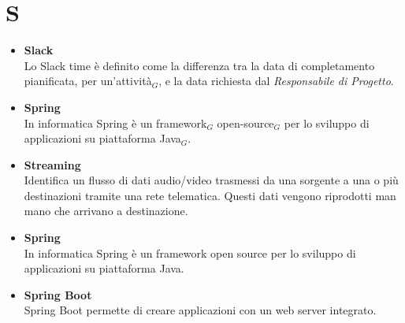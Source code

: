 \chapter{S} \label{S}
\begin{itemize}
	\item \textbf{Slack} \\
	Lo Slack time è definito come la differenza tra la data di completamento pianificata, per un'attività$_G$, e la data richiesta dal \textit{Responsabile di Progetto}.
	
	\item \textbf{Spring}\\
	In informatica Spring è un framework$_G$ open-source$_G$ per lo sviluppo di applicazioni su piattaforma Java$_G$.
	
	\item \textbf{Streaming}\\
	Identifica un flusso di dati audio/video trasmessi da una sorgente a una o più destinazioni tramite una rete telematica. Questi dati vengono riprodotti man mano che arrivano a destinazione.
	
	\item \textbf{Spring}\\
	In informatica Spring è un framework open source per lo sviluppo di applicazioni su piattaforma Java.
	
	\item \textbf{Spring Boot}\\
	Spring Boot permette di creare applicazioni con un web server integrato.
\end{itemize}
	